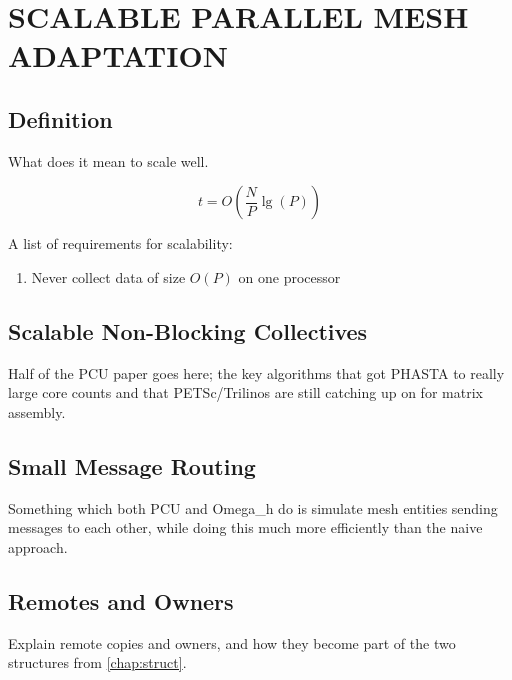 
\chapter{SCALABLE PARALLEL MESH ADAPTATION}

\section{Definition}

What does it mean to scale well.

\begin{equation} \label{eq:big-o-scale}
t = O\left(\frac{N}{P}\lg(P)\right)
\end{equation}

A list of requirements for scalability:

\begin{enumerate}
\item Never collect data of size $O(P)$ on one processor
\end{enumerate}

\section{Scalable Non-Blocking Collectives}

Half of the PCU paper goes here; the key algorithms
that got PHASTA to really large core counts and
that PETSc/Trilinos are still catching up on for
matrix assembly.

\section{Small Message Routing}

Something which both PCU and Omega\_h do is simulate
mesh entities sending messages to each other, while
doing this much more efficiently than the naive approach.

\section{Remotes and Owners}

Explain remote copies and owners, and how they become
part of the two structures from \ref{chap:struct}.

